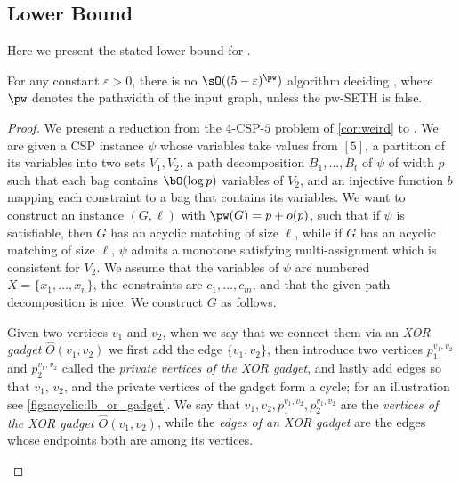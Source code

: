 \subsection{Lower Bound}\label{subsec:acyclic:lb}

Here we present the stated lower bound for \AcyclicM.

\begin{theoremrep}[\appsymb]\label{thm:acyclic:lb}
    For any constant $\varepsilon > 0$,
    there is no $\sO((5-\varepsilon)^\pw)$ algorithm deciding \AcyclicM,
    where $\pw$ denotes the pathwidth of the input graph,
    unless the pw-SETH is false.
\end{theoremrep}

\begin{proof}
    We present a reduction from the $4$-CSP-$5$ problem of \cref{cor:weird} to \AcyclicM.
    We are given a \textsc{CSP} instance $\psi$ whose variables take values from $[5]$,
    a partition of its variables into two sets $V_1, V_2$,
    a path decomposition $B_1, \ldots, B_t$ of $\psi$ of width $p$
    such that each bag contains $\bO(\log p)$ variables of $V_2$,
    and an injective function $b$ mapping each constraint to a bag that contains its variables.
    We want to construct an {\AcyclicM} instance $(G,\ell)$ with $\pw(G) = p + o(p)$,
    such that if $\psi$ is satisfiable, then $G$ has an acyclic matching of size $\ell$,
    while if $G$ has an acyclic matching of size $\ell$,
    $\psi$ admits a monotone satisfying multi-assignment which is consistent for $V_2$.
    We assume that the variables of $\psi$ are numbered $X = \{ x_1,\ldots, x_n \}$,
    the constraints are $c_1, \ldots, c_m$,
    and that the given path decomposition is nice.
    We construct $G$ as follows.


    Given two vertices $v_1$ and $v_2$, when we say that we connect them via an \emph{XOR gadget} $\hat{O}(v_1,v_2)$
    we first add the edge $\{v_1,v_2\}$,
    then introduce two vertices $p^{v_1,v_2}_1$ and $p^{v_1,v_2}_2$ called the \emph{private vertices of the XOR gadget},
    and lastly add edges so that $v_1$, $v_2$, and the private vertices of the gadget form a cycle;
    for an illustration see \cref{fig:acyclic:lb_or_gadget}.
    We say that $v_1,v_2,p^{v_1,v_2}_1,p^{v_1,v_2}_2$ are the \emph{vertices of the XOR gadget $\hat{O}(v_1,v_2)$},
    while the \emph{edges of an XOR gadget} are the edges whose endpoints both are among its vertices.


    \begin{figure}[htb]
        \centering
        \begin{tikzpicture}[scale=1, transform shape]


\end{tikzpicture}
\end{figure}
\end{proof}
